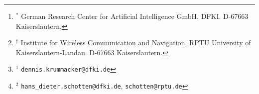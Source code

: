 %
\author{%
Dennis Krummacker$^{1,*}$
and
Hans D. Schotten$^{2,*,\dag}$%
%
\thanks{%
$^{*}$%
German Research Center for Artificial Intelligence GmbH, DFKI.
D-67663 Kaiserslautern.%
}%
%
\thanks{%
$^{\dag}$%
Institute for Wireless Communication and Navigation,
RPTU University of Kaiserslautern-Landau.
D-67663 Kaiserslautern.%
}%
%
\thanks{%
$^{1}$%
{\tt\small dennis.krummacker@dfki.de}
}%
%
\thanks{%
$^{2}$%
{\tt\small hans\_dieter.schotten@dfki.de}, %
{\tt\small schotten@rptu.de}
}%
}%
%